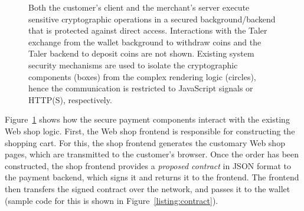 \documentclass{llncs}
\begin{document}
\begin{figure}[t!]
\begin{center}
\end{center}
 \caption{Both the customer's client and the merchant's server
          execute sensitive cryptographic operations in a
          secured background/backend that is protected against direct access.
          Interactions with the Taler exchange from the wallet background
          to withdraw coins and the Taler backend
          to deposit coins are not shown.
          Existing system security mechanisms
          are used to isolate the cryptographic components (boxes) from
          the complex rendering logic (circles), hence the communication
          is restricted to JavaScript signals or HTTP(S), respectively.}
 \label{fig:frobearch}
\end{figure}

Figure~\ref{fig:frobearch} shows how the secure payment components
interact with the existing Web shop logic.  First, the Web shop
frontend is responsible for constructing the shopping cart.  For this,
the shop frontend generates the customary Web shop pages, which are transmitted
to the customer's browser.  Once the order has been constructed, the
shop frontend provides a {\em proposed contract} in JSON format to the
payment backend, which signs it and returns it to the frontend.  The
frontend then transfers the signed contract over the network, and
passes it to the wallet (sample code for this is shown in
Figure~\ref{listing:contract}).
\end{document}
